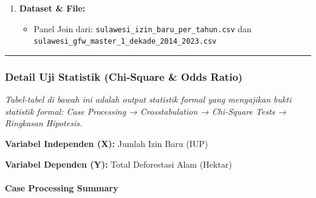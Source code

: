 \documentclass[
]{article}
\providecommand{\tightlist}{%
  \setlength{\itemsep}{0pt}\setlength{\parskip}{0pt}}
\begin{document}
\begin{enumerate}
  \begin{itemize}
  \tightlist
  \item
    \textbf{Variabel Independen (X):} \texttt{Jumlah\_Izin\_Baru} atau
    \texttt{Total\_Luas\_Konsesi\_Baru\_Ha} (Interaktif Dropdown).
  \item
    \textbf{Variabel Dependen (Y):} \texttt{Total\_Deforestasi\_Ha} atau
    \texttt{Deforestasi\_Driver\_Komoditas\_Tambang\_Sawit\_Ha}
    (Interaktif Dropdown).
  \end{itemize}
\item
  \textbf{Dataset \& File:}

  \begin{itemize}
  \tightlist
  \item
    Panel Join dari: \texttt{sulawesi\_izin\_baru\_per\_tahun.csv} dan
    \texttt{sulawesi\_gfw\_master\_1\_dekade\_2014\_2023.csv}
  \end{itemize}
\end{enumerate}

\begin{center}\rule{0.5\linewidth}{0.5pt}\end{center}

\subsubsection{Detail Uji Statistik (Chi-Square \& Odds
Ratio)}\label{detail-uji-statistik-chi-square-odds-ratio}

\emph{Tabel-tabel di bawah ini adalah output statistik formal yang
menyajikan bukti statistik formal: Case Processing → Crosstabulation →
Chi-Square Tests → Ringkasan Hipotesis.}

\textbf{Variabel Independen (X):} Jumlah Izin Baru (IUP)

\textbf{Variabel Dependen (Y):} Total Deforestasi Alam (Hektar)

\paragraph{Case Processing Summary}\label{case-processing-summary}
\end{document}
